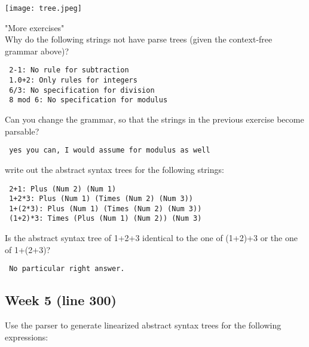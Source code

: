 \documentclass{article}
\theoremstyle{theorem}
\theoremstyle{definition}
\theoremstyle{remark}
\begin{document}
\texttt{[image: tree.jpeg]}

{\large "More exercises"\\}
Why do the following strings not have parse trees (given the context-free grammar above)?

\begin{verbatim}
 2-1: No rule for subtraction
 1.0+2: Only rules for integers
 6/3: No specification for division
 8 mod 6: No specification for modulus
\end{verbatim}

Can you change the grammar, so that the strings in the previous exercise become parsable?

\begin{verbatim}
 yes you can, I would assume for modulus as well
\end{verbatim}

write out the abstract syntax trees for the following strings:
\begin{verbatim}
 2+1: Plus (Num 2) (Num 1)
 1+2*3: Plus (Num 1) (Times (Num 2) (Num 3))
 1+(2*3): Plus (Num 1) (Times (Num 2) (Num 3))
 (1+2)*3: Times (Plus (Num 1) (Num 2)) (Num 3)
\end{verbatim}

Is the abstract syntax tree of 1+2+3 identical to the one of (1+2)+3 or the one of 1+(2+3)?
\begin{verbatim}
 No particular right answer.
\end{verbatim}

\subsection{Week 5 (line 300)} 

Use the parser to generate linearized abstract syntax trees for the following expressions:
\end{document}

